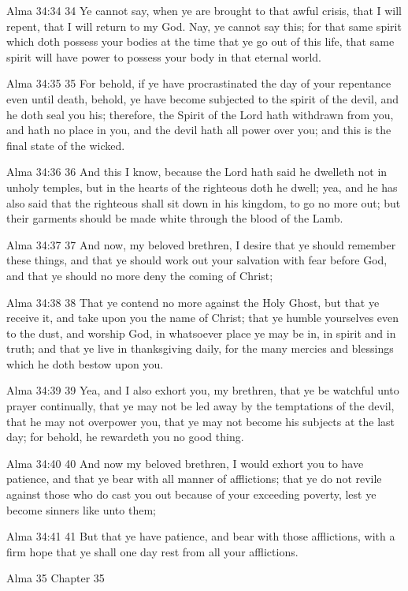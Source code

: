 Alma 34:34
 34 Ye cannot say, when ye are brought to that awful crisis, that
I will repent, that I will return to my God. Nay, ye cannot say
this; for that same spirit which doth possess your bodies at the
time that ye go out of this life, that same spirit will have
power to possess your body in that eternal world.

Alma 34:35
 35 For behold, if ye have procrastinated the day of your
repentance even until death, behold, ye have become subjected to
the spirit of the devil, and he doth seal you his; therefore, the
Spirit of the Lord hath withdrawn from you, and hath no place in
you, and the devil hath all power over you; and this is the final
state of the wicked.

Alma 34:36
 36 And this I know, because the Lord hath said he dwelleth not
in unholy temples, but in the hearts of the righteous doth he
dwell; yea, and he has also said that the righteous shall sit
down in his kingdom, to go no more out; but their garments should
be made white through the blood of the Lamb.

Alma 34:37
 37 And now, my beloved brethren, I desire that ye should
remember these things, and that ye should work out your salvation
with fear before God, and that ye should no more deny the coming
of Christ;

Alma 34:38
 38 That ye contend no more against the Holy Ghost, but that ye
receive it, and take upon you the name of Christ; that ye humble
yourselves even to the dust, and worship God, in whatsoever place
ye may be in, in spirit and in truth; and that ye live in
thanksgiving daily, for the many mercies and blessings which he
doth bestow upon you.

Alma 34:39
 39 Yea, and I also exhort you, my brethren, that ye be watchful
unto prayer continually, that ye may not be led away by the
temptations of the devil, that he may not overpower you, that ye
may not become his subjects at the last day; for behold, he
rewardeth you no good thing.

Alma 34:40
 40 And now my beloved brethren, I would exhort you to have
patience, and that ye bear with all manner of afflictions; that
ye do not revile against those who do cast you out because of
your exceeding poverty, lest ye become sinners like unto them;

Alma 34:41
 41 But that ye have patience, and bear with those afflictions,
with a firm hope that ye shall one day rest from all your
afflictions.

Alma 35
Chapter 35

